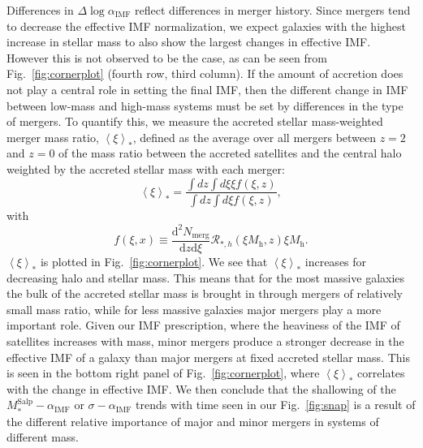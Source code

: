\documentclass[usenatbib]{mnras}
\def\mhalo{M_{\mathrm{h}}}
\def\msalp{M_*^{\mathrm{Salp}}}
\def\aimf{\alpha_{\mathrm{IMF}}}
\def\Fref#1{Fig.~\ref{#1}\xspace}
\begin{document}
Differences in $\Delta\log{\aimf}$ reflect differences in merger
history.  Since mergers tend to decrease the effective IMF
normalization, we expect galaxies with the highest increase in stellar
mass to also show the largest changes in effective IMF. However this
is not observed to be the case, as can be seen from
\Fref{fig:cornerplot} (fourth row, third column).  If the amount of
accretion does not play a central role in setting the final IMF, then
the different change in IMF between low-mass and high-mass systems
must be set by differences in the type of mergers. To quantify this,
we measure the accreted stellar mass-weighted merger mass ratio,
$\left< \xi \right>_*$, defined as the average over all mergers
between $z=2$ and $z=0$ of the mass ratio between the accreted
satellites and the central halo weighted by the accreted stellar mass
with each merger:
\begin{equation}\label{eq:xieff}
\left< \xi \right>_* = \frac{\int dz \int d\xi \xi f(\xi, z)}{\int dz \int d\xi f(\xi, z)},
\end{equation}
with
\begin{equation}
f(\xi, x) \equiv \frac{\mathrm{d}^2N_{\mathrm{merg}}}{\mathrm{d}z \mathrm{d}\xi} \mathcal{R}_{*,h}(\xi \mhalo, z)\xi\mhalo.
\end{equation}
$\left< \xi \right>_*$ is plotted in \Fref{fig:cornerplot}. We see that $\left< \xi \right>_*$ increases for decreasing halo and stellar mass.
This means that for the most massive galaxies the bulk of the accreted stellar mass is brought in through mergers of relatively small mass ratio, while for less massive galaxies major mergers play a more important role.
Given our IMF prescription, where the heaviness of the IMF of satellites increases with mass, minor mergers produce a stronger decrease in the effective IMF of a galaxy than major mergers at fixed accreted stellar mass. 
This is seen in the bottom right panel of \Fref{fig:cornerplot}, where $\left< \xi \right>_*$ correlates with the change in effective IMF.
We then conclude that the shallowing of the $\msalp-\aimf$ or $\sigma-\aimf$ trends with time seen in our \Fref{fig:snap} is a result of the different relative importance of major and minor mergers in systems of different mass.
\end{document}
